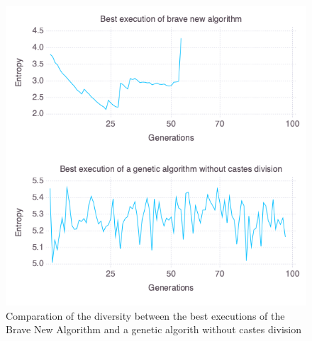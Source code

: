 \begin{figure}[]
	\centering	
	\includegraphics[scale=0.5]{./figures/Rastrigin_diversity_algs_comparation.png}
	\caption{ Comparation of the diversity between the best executions of the Brave New Algorithm and a genetic algorith without castes division }
    \label{fig:diversity_comparation}
\end{figure}


